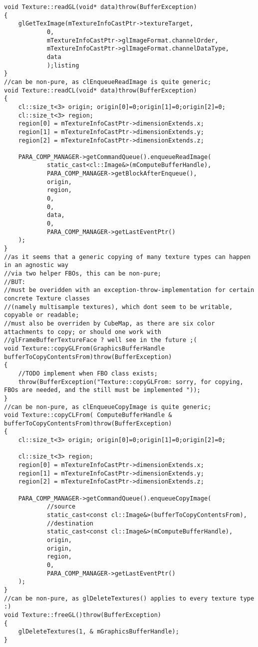 \begin{lstlisting}
void Texture::readGL(void* data)throw(BufferException)
{
	glGetTexImage(mTextureInfoCastPtr->textureTarget,
			0,
			mTextureInfoCastPtr->glImageFormat.channelOrder,
			mTextureInfoCastPtr->glImageFormat.channelDataType,
			data
			);listing
}
//can be non-pure, as clEnqueueReadImage is quite generic;
void Texture::readCL(void* data)throw(BufferException)
{
	cl::size_t<3> origin; origin[0]=0;origin[1]=0;origin[2]=0;
	cl::size_t<3> region;
	region[0] =	mTextureInfoCastPtr->dimensionExtends.x;
	region[1] =	mTextureInfoCastPtr->dimensionExtends.y;
	region[2] =	mTextureInfoCastPtr->dimensionExtends.z;

	PARA_COMP_MANAGER->getCommandQueue().enqueueReadImage(
			static_cast<cl::Image&>(mComputeBufferHandle),
			PARA_COMP_MANAGER->getBlockAfterEnqueue(),
			origin,
			region,
			0,
			0,
			data,
			0,
			PARA_COMP_MANAGER->getLastEventPtr()
	);
}
//as it seems that a generic copying of many texture types can happen in an agnostic way
//via two helper FBOs, this can be non-pure;
//BUT:
//must be overidden with an exception-throw-implementation for certain concrete Texture classes
//(namely multisample textures), which dont seem to be writable, copyable or readable;
//must also be overriden by CubeMap, as there are six color attachments to copy; or should one work with
//glFrameBufferTextureFace ? well see in the future ;(
void Texture::copyGLFrom(GraphicsBufferHandle bufferToCopyContentsFrom)throw(BufferException)
{
	//TODO implement when FBO class exists;
	throw(BufferException("Texture::copyGLFrom: sorry, for copying, FBOs are needed, and the still must be implemented "));
}
//can be non-pure, as clEnqueueCopyImage is quite generic;
void Texture::copyCLFrom( ComputeBufferHandle & bufferToCopyContentsFrom)throw(BufferException)
{
	cl::size_t<3> origin; origin[0]=0;origin[1]=0;origin[2]=0;

	cl::size_t<3> region;
	region[0] =	mTextureInfoCastPtr->dimensionExtends.x;
	region[1] =	mTextureInfoCastPtr->dimensionExtends.y;
	region[2] =	mTextureInfoCastPtr->dimensionExtends.z;

	PARA_COMP_MANAGER->getCommandQueue().enqueueCopyImage(
			//source
			static_cast<const cl::Image&>(bufferToCopyContentsFrom),
			//destination
			static_cast<const cl::Image&>(mComputeBufferHandle),
			origin,
			origin,
			region,
			0,
			PARA_COMP_MANAGER->getLastEventPtr()
	);
}
//can be non-pure, as glDeleteTextures() applies to every texture type :)
void Texture::freeGL()throw(BufferException)
{
	glDeleteTextures(1, & mGraphicsBufferHandle);
}
\end{lstlisting}

